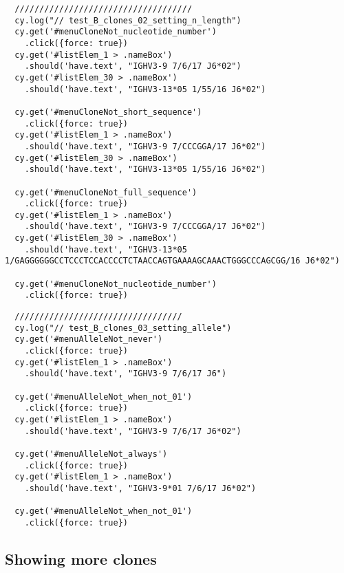 \begin{verbatim}
  ////////////////////////////////////
  cy.log("// test_B_clones_02_setting_n_length")
  cy.get('#menuCloneNot_nucleotide_number')
    .click({force: true})
  cy.get('#listElem_1 > .nameBox')
    .should('have.text', "IGHV3-9 7/6/17 J6*02")
  cy.get('#listElem_30 > .nameBox')
    .should('have.text', "IGHV3-13*05 1/55/16 J6*02")

  cy.get('#menuCloneNot_short_sequence')
    .click({force: true})
  cy.get('#listElem_1 > .nameBox')
    .should('have.text', "IGHV3-9 7/CCCGGA/17 J6*02")
  cy.get('#listElem_30 > .nameBox')
    .should('have.text', "IGHV3-13*05 1/55/16 J6*02")

  cy.get('#menuCloneNot_full_sequence')
    .click({force: true})
  cy.get('#listElem_1 > .nameBox')
    .should('have.text', "IGHV3-9 7/CCCGGA/17 J6*02")
  cy.get('#listElem_30 > .nameBox')
    .should('have.text', "IGHV3-13*05 1/GAGGGGGGCCTCCCTCCACCCCTCTAACCAGTGAAAAGCAAACTGGGCCCAGCGG/16 J6*02")

  cy.get('#menuCloneNot_nucleotide_number')
    .click({force: true})

\end{verbatim}



\begin{verbatim}
  //////////////////////////////////
  cy.log("// test_B_clones_03_setting_allele")
  cy.get('#menuAlleleNot_never')
    .click({force: true})
  cy.get('#listElem_1 > .nameBox')
    .should('have.text', "IGHV3-9 7/6/17 J6")

  cy.get('#menuAlleleNot_when_not_01')
    .click({force: true})
  cy.get('#listElem_1 > .nameBox')
    .should('have.text', "IGHV3-9 7/6/17 J6*02")

  cy.get('#menuAlleleNot_always')
    .click({force: true})
  cy.get('#listElem_1 > .nameBox')
    .should('have.text', "IGHV3-9*01 7/6/17 J6*02")

  cy.get('#menuAlleleNot_when_not_01')
    .click({force: true})

\end{verbatim}

\subsection{Showing more clones}

